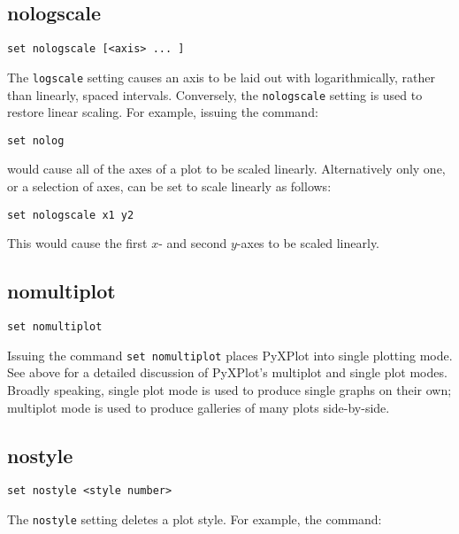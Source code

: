 \subsection{nologscale}

\begin{verbatim}
set nologscale [<axis> ... ]
\end{verbatim}

The {\tt logscale} setting causes an axis to be laid out with logarithmically,
rather than linearly, spaced intervals. Conversely, the {\tt nologscale} setting
is used to restore linear scaling. For example, issuing the command:

\begin{verbatim}
set nolog
\end{verbatim}

\noindent would cause all of the axes of a plot to be scaled linearly. Alternatively only one,
or a selection of axes, can be set to scale linearly as follows:

\begin{verbatim}
set nologscale x1 y2
\end{verbatim}

This would cause the first $x$- and second $y$-axes to be scaled linearly.


\subsection{nomultiplot}

\begin{verbatim}
set nomultiplot
\end{verbatim}

Issuing the command {\tt set nomultiplot} places PyXPlot into single plotting
mode.  See above for a detailed discussion of PyXPlot's multiplot and
single plot modes. Broadly speaking, single plot mode is used to produce single
graphs on their own; multiplot mode is used to produce galleries of many plots
side-by-side.


\subsection{nostyle}

\begin{verbatim}
set nostyle <style number>
\end{verbatim}

The {\tt nostyle} setting deletes a plot style. For example, the command:


